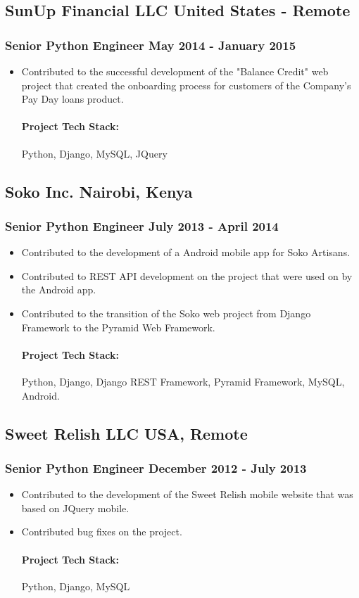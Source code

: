\documentclass[11pt]{article} %
\begin{document}
\subsection{SunUp Financial LLC \hfill United States - Remote}
\subsubsection{Senior Python Engineer \hfill  May 2014 - January 2015}
\begin{itemize}
    \item Contributed to the successful development of the "Balance Credit" web project that created the onboarding process for customers of the Company's Pay Day loans product.
    \paragraph{Project Tech Stack:} Python, Django, MySQL, JQuery
\end{itemize}

\subsection{Soko Inc. \hfill Nairobi, Kenya}
\subsubsection{Senior Python Engineer \hfill  July 2013 - April 2014}
\begin{itemize}
    \item Contributed to the development of a Android mobile app for Soko Artisans.
    \item Contributed to REST API development on the project that were used on by the Android app.
    \item Contributed to the transition of the Soko web project from Django Framework to the Pyramid Web Framework.
    \paragraph{Project Tech Stack:} Python, Django, Django REST Framework, Pyramid Framework, MySQL, Android.
\end{itemize}

\subsection{Sweet Relish LLC \hfill USA, Remote}
\subsubsection{Senior Python Engineer \hfill  December 2012 - July 2013}
\begin{itemize}
    \item Contributed to the development of the Sweet Relish mobile website that was based on JQuery mobile.
    \item Contributed bug fixes on the project.
    \paragraph{Project Tech Stack:} Python, Django, MySQL
\end{itemize}
\end{document}
